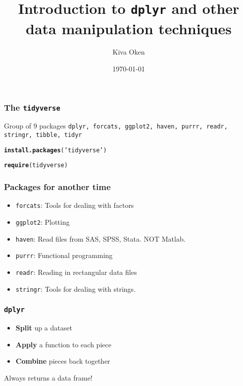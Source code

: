 \documentclass{beamer}\usepackage[]{graphicx}\usepackage[]{color}
\title{Introduction to \texttt{dplyr} and other data manipulation techniques}
\author{Kiva Oken}
\date{\today}
\makeatletter
\newcommand{\hlstr}[1]{\textcolor[rgb]{0.192,0.494,0.8}{#1}}%
\newcommand{\hlstd}[1]{\textcolor[rgb]{0.345,0.345,0.345}{#1}}%
\newcommand{\hlkwd}[1]{\textcolor[rgb]{0.737,0.353,0.396}{\textbf{#1}}}%
\newenvironment{kframe}{%
 \def\at@end@of@kframe{}%
 \ifinner\ifhmode%
  \def\at@end@of@kframe{\end{minipage}}%
  \begin{minipage}{\columnwidth}%
 \fi\fi%
 \def\FrameCommand##1{\hskip\@totalleftmargin \hskip-\fboxsep
 \colorbox{shadecolor}{##1}\hskip-\fboxsep
     \hskip-\linewidth \hskip-\@totalleftmargin \hskip\columnwidth}%
 \MakeFramed {\advance\hsize-\width
   \@totalleftmargin\z@ \linewidth\hsize
   \@setminipage}}%
 {\par\unskip\endMakeFramed%
 \at@end@of@kframe}
\newenvironment{knitrout}{}{} %
\makeatother
\begin{document}
\frame{\titlepage}

\begin{frame}
  \frametitle{The \texttt{tidyverse}}
  {\Large 
  \begin{block}{Group of 9 packages}
    \centering \texttt{\alert<2->{dplyr}, forcats, ggplot2, haven, purrr, readr, stringr,
      \alert<2->{tibble}, \alert<2->{tidyr}}
  \end{block}}
  \pause \pause
\begin{knitrout}
\color{fgcolor}\begin{kframe}
\begin{alltt}
\hlkwd{install.packages}\hlstd{(}\hlstr{'tidyverse'}\hlstd{)}
\end{alltt}
\end{kframe}
\end{knitrout}
  \vspace{-15pt}
\begin{knitrout}
\color{fgcolor}\begin{kframe}
\begin{alltt}
\hlkwd{require}\hlstd{(tidyverse)}
\end{alltt}
\end{kframe}
\end{knitrout}
\end{frame}

\begin{frame}
  \frametitle{Packages for another time}
  \begin{itemize}
    \item \texttt{forcats}: Tools for dealing with factors
    \item \texttt{ggplot2}: Plotting
    \item \texttt{haven}: Read files from SAS, SPSS, Stata. NOT Matlab.
    \item \texttt{purrr}: Functional programming
    \item \texttt{readr}: Reading in rectangular data files
    \item \texttt{stringr}: Tools for dealing with strings.
  \end{itemize}
\end{frame}

\begin{frame}
  \frametitle{\texttt{dplyr}}
  \begin{itemize}
    \item \textbf{Split} up a dataset
    \item \textbf{Apply} a function to each piece
    \item \textbf{Combine} pieces back together
  \end{itemize}
  \bigskip \Large \centering Always returns a data frame!
\end{frame}
\end{document}
